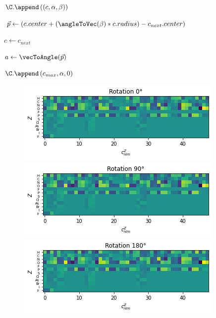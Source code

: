 \begin{algorithm}[p]
{    $\C.\append \left(
        \left(c , \alpha , \beta \right)
      \right)
    $
  
    $ \vec{p} \leftarrow \left( c.center + (\angleToVec(\beta) * c.radius ) - c_{next}.center\right)$
    
    $ c \leftarrow c_{next} $
    
    $  a \leftarrow \vecToAngle(\vec{p}) $
  
    }
  
    $\C.\append \left( c_{max}, \alpha, 0 \right)$
  
\end{algorithm}
  
  

\begin{figure}
  \begin{multicols}{2}
      \includegraphics[width=\linewidth]{figures/regression/snap/rot0.png}\par 
      \includegraphics[width=\linewidth]{figures/regression/snap/rot90.png}\par 
  \end{multicols}
  \begin{multicols}{2}
      \includegraphics[width=\linewidth]{figures/regression/snap/rot180.png}\par

\end{multicols}
\end{figure}
